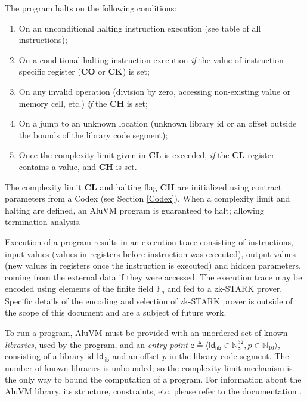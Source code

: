 \documentclass[a4paper]{article}
\begin{document}
\begin{multicols}{2}
The program halts on the following conditions:

\begin{enumerate}
\item On an unconditional halting instruction execution (see table of all instructions);
\item On a conditional halting instruction execution
   \emph{if} the value of instruction-specific register (\textbf{CO} or \textbf{CK}) is set;
\item On any invalid operation (division by zero, accessing non-existing value or memory cell, etc.)
   \emph{if} the \textbf{CH} is set;
\item On a jump to an unknown location
   (unknown library id or an offset outside the bounds of the library code segment);
\item Once the complexity limit given in \textbf{CL} is exceeded,
   \emph{if} the \textbf{CL} register contains a value, and \textbf{CH} is set.
\end{enumerate}

The complexity limit \textbf{CL} and halting flag \textbf{CH} are initialized using contract parameters
from a Codex (see Section \ref{Codex}). When a complexity limit and halting are defined, an AluVM program
is guaranteed to halt; allowing termination analysis.

Execution of a program results in an execution trace consisting of instructions,
input values (values in registers before instruction was executed),
output values (new values in registers once the instruction is executed)
and hidden parameters, coming from the external data if they were accessed.
The execution trace may be encoded using elements of the finite field $\mathbb{F}_q$
and fed to a zk-STARK prover. Specific details of the encoding and selection of zk-STARK
prover is outside of the scope of this document and are a subject of future work.

To run a program, AluVM must be provided with an unordered set of known \emph{libraries},
used by the program, and an \emph{entry point} 
$\mathsf{e} \triangleq \langle \mathsf{Id_{lib}} \in \mathbb{N}^{32}_8, p \in \mathbb{N}_{16} \rangle$,
consisting of a library id $\mathsf{Id_{lib}}$ and an offset $p$ in the library code segment.
The number of known libraries is unbounded; so the complexity limit mechanism
is the only way to bound the computation of a program.
For information about the AluVM library, its structure, constraints, etc. please refer to the
documentation \cite{AluVM}.


\end{multicols}
\end{document}
